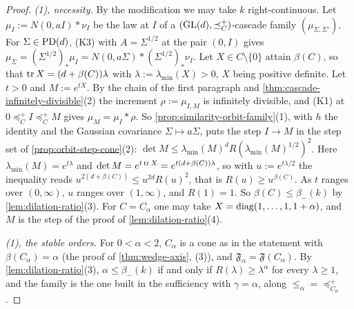 \begin{proof}
\emph{(1), necessity.} By the modification we may take $k$ right-continuous. Let $\mu_I := N(0, aI) * \nu_I$ be the law at $I$ of a $(\mathrm{GL}(d), \preceq^+_C)$-cascade
family $(\mu_{\Sigma,\Sigma'})$. For $\Sigma \in \mathrm{PD}(d)$, (K3) with $A = \Sigma^{1/2}$ at the pair $(0, I)$ gives
$\mu_\Sigma = (\Sigma^{1/2})_*\mu_I = N(0, a\Sigma) * (\Sigma^{1/2})_*\nu_I$. Let $X \in C \setminus \{0\}$ attain
$\beta(C)$, so that $\operatorname{tr} X = (d + \beta(C))\lambda$ with $\lambda := \lambda_{\min}(X) > 0$, $X$ being positive definite. Let $t > 0$ and $M := e^{tX}$. By the chain of the first paragraph and
\ref{thm:cascade-infinitely-divisible}(2) the increment $\rho := \mu_{I,M}$ is infinitely divisible, and (K1) at
$0 \preceq^+_C I \preceq^+_C M$ gives $\mu_M = \mu_I * \rho$. So \ref{prop:similarity-orbit-family}(1), with $h$ the
identity and the Gaussian covariance $\Sigma \mapsto a\Sigma$, puts the step $I \to M$ in the step set of
\ref{prop:orbit-step-cone}(2): $\det M \le \lambda_{\min}(M)^dR(\lambda_{\min}(M)^{1/2})^2$. Here
$\lambda_{\min}(M) = e^{t\lambda}$ and $\det M = e^{t\operatorname{tr} X} = e^{t(d+\beta(C))\lambda}$, so with $u := e^{t\lambda/2}$ the
inequality reads $u^{2(d+\beta(C))} \le u^{2d}R(u)^2$, that is $R(u) \ge u^{\beta(C)}$. As $t$ ranges over
$(0, \infty)$, $u$ ranges over $(1, \infty)$, and $R(1) = 1$. So $\beta(C) \le \beta_-(k)$ by
\ref{lem:dilation-ratio}(3). For $C = C_\alpha$ one may take $X = \operatorname{diag}(1, \dots, 1, 1 + \alpha)$, and $M$ is the
step of the proof of \ref{lem:dilation-ratio}(4).

\emph{(1), the stable orders.} For $0 < \alpha < 2$, $C_\alpha$ is a cone as in the statement with
$\beta(C_\alpha) = \alpha$ (the proof of \ref{thm:wedge-axis}, (3)), and $\mathfrak F_\alpha = \mathfrak F(C_\alpha)$. By
\ref{lem:dilation-ratio}(3), $\alpha \le \beta_-(k)$ if and only if $R(\lambda) \ge \lambda^\alpha$ for every
$\lambda \ge 1$, and the family is the one built in the sufficiency with $\gamma = \alpha$, along
$\le_\alpha = \preceq^+_{C_\alpha}$.


\end{proof}
